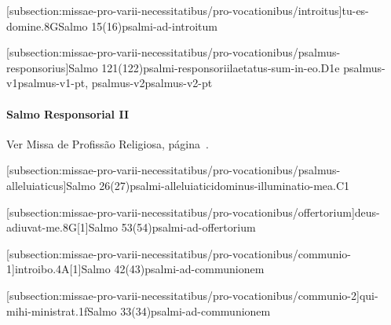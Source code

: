 \def\Prefix{subsection:missae-pro-varii-necessitatibus/pro-vocationibus}

[\Prefix/introitus]{tu-es-domine.8G}{Salmo 15(16)}{psalmi-ad-introitum}

[\Prefix/psalmus-responsorius]{Salmo 121(122)}{psalmi-responsorii}{laetatus-sum-in-eo.D1e}{
  {psalmus-v1}{psalmus-v1-pt},
  {psalmus-v2}{psalmus-v2-pt}
}

\paragraph{Salmo Responsorial II}
\begin{rubrica}
  Ver Missa de Profissão Religiosa, página~\pageref{subsection:missae-rituales/missa-in-professione-religiosa/psalmus-responsorius-2}.
\end{rubrica}

\AllowPageFlush

[\Prefix/psalmus-alleluiaticus]{Salmo 26(27)}{psalmi-alleluiatici}{dominus-illuminatio-mea.C1}

\AllowPageFlush

[\Prefix/offertorium]{deus-adiuvat-me.8G}[1]{Salmo 53(54)}{psalmi-ad-offertorium}

\AllowPageFlush

[\Prefix/communio-1]{introibo.4A}[1]{Salmo 42(43)}{psalmi-ad-communionem}

\AllowPageFlush

[\Prefix/communio-2]{qui-mihi-ministrat.1f}{Salmo 33(34)}{psalmi-ad-communionem}